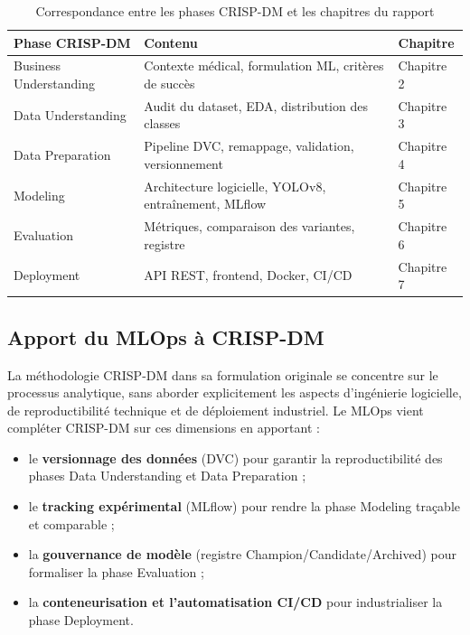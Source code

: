 \documentclass{rapportENSIAS}
\begin{document}
\begin{table}[H]
\centering
\caption{Correspondance entre les phases CRISP-DM et les chapitres du rapport}
\label{tab:crisp_mapping}
\begin{tabular}{lll}
\toprule
\textbf{Phase CRISP-DM} & \textbf{Contenu} & \textbf{Chapitre} \\
\midrule
Business Understanding  & Contexte médical, formulation ML, critères de succès   & Chapitre 2 \\
Data Understanding      & Audit du dataset, EDA, distribution des classes        & Chapitre 3 \\
Data Preparation        & Pipeline DVC, remappage, validation, versionnement      & Chapitre 4 \\
Modeling                & Architecture logicielle, YOLOv8, entraînement, MLflow  & Chapitre 5 \\
Evaluation              & Métriques, comparaison des variantes, registre         & Chapitre 6 \\
Deployment              & API REST, frontend, Docker, CI/CD                       & Chapitre 7 \\
\bottomrule
\end{tabular}
\end{table}

\subsection{Apport du MLOps à CRISP-DM}

La méthodologie CRISP-DM dans sa formulation originale se concentre sur le processus analytique, sans aborder explicitement les aspects d'ingénierie logicielle, de reproductibilité technique et de déploiement industriel. Le MLOps vient compléter CRISP-DM sur ces dimensions en apportant :

\begin{itemize}
    \item le \textbf{versionnage des données} (DVC) pour garantir la reproductibilité des phases Data Understanding et Data Preparation ;
    \item le \textbf{tracking expérimental} (MLflow) pour rendre la phase Modeling traçable et comparable ;
    \item la \textbf{gouvernance de modèle} (registre Champion/Candidate/Archived) pour formaliser la phase Evaluation ;
    \item la \textbf{conteneurisation et l'automatisation CI/CD} pour industrialiser la phase Deployment.
\end{itemize}
\end{document}
